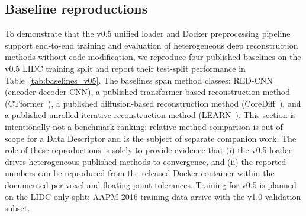 \documentclass[twoside,11pt]{article}
\begin{document}
\subsection*{Baseline reproductions}
To demonstrate that the v0.5 unified loader and Docker preprocessing pipeline support end-to-end training and evaluation of heterogeneous deep reconstruction methods without code modification, we reproduce four published baselines on the v0.5 LIDC training split and report their test-split performance in Table~\ref{tab:baselines_v05}. The baselines span method classes: RED-CNN~\citep{chen2017redcnn} (encoder-decoder CNN), a published transformer-based reconstruction method (CTformer~\citep{ctformer2023}), a published diffusion-based reconstruction method (CoreDiff~\citep{corediff2023}), and a published unrolled-iterative reconstruction method (LEARN~\citep{learn2018}). This section is intentionally not a benchmark ranking: relative method comparison is out of scope for a Data Descriptor and is the subject of separate companion work. The role of these reproductions is solely to provide evidence that (i) the v0.5 loader drives heterogeneous published methods to convergence, and (ii) the reported numbers can be reproduced from the released Docker container within the documented per-voxel and floating-point tolerances. Training for v0.5 is planned on the LIDC-only split; AAPM 2016 training data arrive with the v1.0 validation subset.
\end{document}
